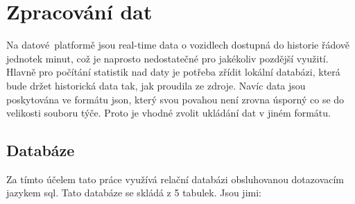 
\chapter{Zpracování dat}

Na datové platformě jsou real-time data o vozidlech dostupná do historie řádově jednotek minut, což je naprosto nedostatečné pro jakékoliv pozdější využití. Hlavně pro počítání statistik nad daty je potřeba zřídit lokální databázi, která bude držet historická data tak, jak proudila ze zdroje. Navíc data jsou poskytována ve formátu \gls{json}, který svou povahou není zrovna úsporný co se do velikosti souboru týče. Proto je vhodné zvolit ukládání dat v jiném formátu.

\section{Databáze}

Za tímto účelem tato práce využívá relační databázi obsluhovanou dotazovacím jazykem \gls{sql}. Tato databáze se skládá z 5 tabulek. Jsou jimi:

